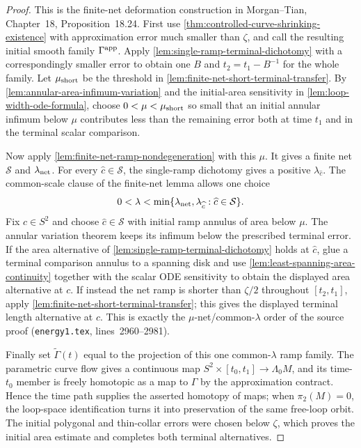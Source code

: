 \begin{proof}
This is the finite-net deformation construction in Morgan--Tian,
Chapter~18, Proposition~18.24.  First use
\ref{thm:controlled-curve-shrinking-existence} with approximation error much
smaller than $\zeta$, and call the resulting initial smooth family
$\Gamma^{\rm app}$.  Apply
\ref{lem:single-ramp-terminal-dichotomy} with a correspondingly smaller error
to obtain one $B$ and $t_2=t_1-B^{-1}$ for the whole family.  Let
$\mu_{\rm short}$ be the threshold in
\ref{lem:finite-net-short-terminal-transfer}.  By
\ref{lem:annular-area-infimum-variation} and the initial-area sensitivity in
\ref{lem:loop-width-ode-formula}, choose $0<\mu<\mu_{\rm short}$ so small that
an initial annular infimum below $\mu$ contributes less than the remaining
error both at time $t_1$ and in the terminal scalar comparison.

Now apply \ref{lem:finite-net-ramp-nondegeneration} with this $\mu$.  It gives
a finite net ${\mathcal S}$ and $\lambda_{\rm net}$.  For every
$\widehat c\in{\mathcal S}$, the single-ramp dichotomy gives a positive
$\lambda_{\widehat c}$.  The common-scale clause of the finite-net lemma
allows one choice
\[
 0<\lambda<\min\{\lambda_{\rm net},
        \lambda_{\widehat c}:\widehat c\in{\mathcal S}\}.
\]
Fix $c\in S^2$ and choose $\widehat c\in{\mathcal S}$ with initial ramp
annulus of area below $\mu$.  The annular variation theorem keeps its
infimum below the prescribed terminal error.  If the area alternative of
\ref{lem:single-ramp-terminal-dichotomy} holds at $\widehat c$, glue a
terminal comparison annulus to a spanning disk and use
\ref{lem:least-spanning-area-continuity} together with the scalar ODE
sensitivity to obtain the displayed area alternative at $c$.  If instead
the net ramp is shorter than $\zeta/2$ throughout $[t_2,t_1]$, apply
\ref{lem:finite-net-short-terminal-transfer}; this gives the displayed
terminal length alternative at $c$.  This is exactly the
$\mu$-net/common-$\lambda$ order of the source proof
(\texttt{energy1.tex}, lines~2960--2981).

Finally set $\widetilde\Gamma(t)$ equal to the projection of this one
common-$\lambda$ ramp family.  The parametric curve flow gives a continuous
map $S^2\times[t_0,t_1]\to\Lambda_0M$, and its time-$t_0$ member is freely
homotopic as a map to $\Gamma$ by the approximation contract.  Hence the
time path supplies the asserted homotopy of maps; when $\pi_2(M)=0$, the
loop-space identification turns it into preservation of the same free-loop
orbit.  The initial polygonal and
thin-collar errors were chosen below $\zeta$, which proves the initial area
estimate and completes both terminal alternatives.
\end{proof}



